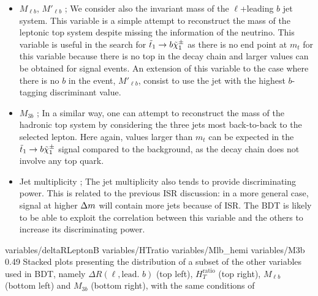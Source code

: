 \begin{itemize}
            hadronic activity in the same hemisphere as the $\MET$ compared to the total hadronic activity of the event,
            $H_T$. Because the visible energy recoils on the LSP in signal events, this variable tends to have
            low values for signal while being around 0.5 for background.
        \item $M_{\ell b}$, $M'_{\ell b}$ ; We consider also the invariant mass of the $\ell$+leading $b$ jet system. This variable
            is a simple attempt to reconstruct the mass of the leptonic top system despite missing
            the information of the neutrino. This variable is useful in the search for $\tilde{t}_1 \rightarrow
            b \tilde{\chi}_1^\pm$ as there is no end point at $m_t$ for this variable because there is no
            top in the decay chain and larger values can be obtained for signal events. An extension
            of this variable to the case where there is no $b$ in the event, $M'_{\ell b}$, consist
            to use the jet with the highest $b$-tagging discriminant value.
        \item $M_{3b}$ ; In a similar way, one can attempt to reconstruct the mass of the hadronic top system by considering the
            three jets most back-to-back to the selected lepton. Here again, values larger than $m_t$ can be expected in
            the $\tilde{t}_1 \rightarrow b \tilde{\chi}_1^\pm$ signal compared to the background, as the decay chain
            does not involve any top quark.
        \item Jet multiplicity ; The jet multiplicity also tends to provide discriminating power.
            This is related to the previous ISR discussion: in a more general case, signal
            at higher $\Delta m$ will contain more jets because of ISR. The BDT is likely to
            be able to exploit the correlation between this variable and the others to
            increase its discriminating power.
    \end{itemize}

                      {variables/deltaRLeptonB}
                      {variables/HTratio}
                      {variables/Mlb_hemi}
                      {variables/M3b}
                      {0.49}
                      {Stacked plots presenting the distribution of a subset of
                      the other variables used in BDT, namely $\Delta R( \ell, \text{lead. } b)$
                      (top left), $H_{T}^\text{ratio}$ (top right), $M_{\ell b}$ (bottom
                      left) and $M_{3b}$ (bottom right), with the same conditions of
                      }

